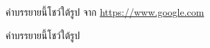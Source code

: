 \documentclass[12pt,oneside,openright,a4paper]{cpe-thai-project}
\begin{document}
    \begin{figure}[!h] %
        \centering
        \caption[คำบรรยายนี้จะโชว์ที่สารบัญ] %
        {คำบรรยายนี้โชว์ใต้รูป จาก \href{https://www.google.com} {https://www.google.com}} 
        \label{fig:x1} %
    \end{figure}

    \begin{figure}[!h] 
        \centering
        \caption[คำบรรยายนี้จะโชว์ที่สารบัญ (2)] %
        {คำบรรยายนี้โชว์ใต้รูป} 
        \label{fig:x2} 
    \end{figure}

\pagebreak %
\end{document}
